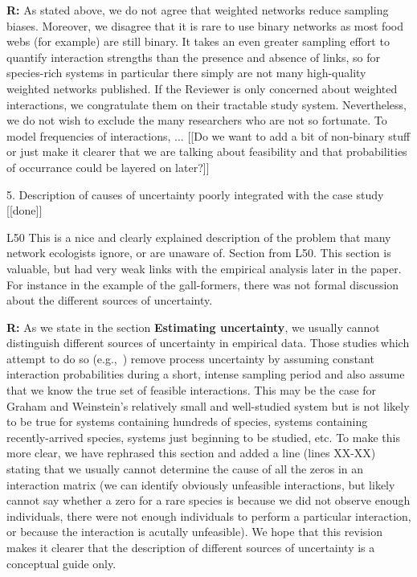 \documentclass[12pt]{letter}
\newenvironment{refquote}{\bigskip \begin{it}}{\end{it}\smallskip}
\begin{document}
		\textbf{R:} As stated above, we do not agree that weighted networks reduce sampling biases. Moreover, we disagree that it is rare to use binary networks as most food webs (for example) are still binary. It takes an even greater sampling effort to quantify interaction strengths than the presence and absence of links, so for species-rich systems in particular there simply are not many high-quality weighted networks published. If the Reviewer is only concerned about weighted interactions, we congratulate them on their tractable study system. Nevertheless, we do not wish to exclude the many researchers who are not so fortunate.
		\smallskip
		To model frequencies of interactions, ...
			 [[Do we want to add a bit of non-binary stuff or just make it clearer that we are talking about feasibility and that probabilities of occurrance could be layered on later?]]


	5. Description of causes of uncertainty poorly integrated with the case study [[done]]

		\begin{refquote}
		L50 This is a nice and clearly explained description of the problem that many network ecologists ignore, or are unaware of.
		Section from L50. This section is valuable, but had very weak links with the empirical analysis later in the paper. For instance in the example of the gall-formers, there was not formal discussion about the different sources of uncertainty. 
		\end{refquote}

		\textbf{R:} As we state in the section \textbf{Estimating uncertainty}, we usually cannot distinguish different sources of uncertainty in empirical data. Those studies which attempt to do so (e.g.,~\citet{Graham2018}) remove process uncertainty by assuming constant interaction probabilities during a short, intense sampling period and also assume that we know the true set of feasible interactions. This may be the case for Graham and Weinstein's relatively small and well-studied system but is not likely to be true for systems containing hundreds of species, systems containing recently-arrived species, systems just beginning to be studied, etc.
		\smallskip
		To make this more clear, we have rephrased this section and added a line (lines XX-XX) stating that we usually cannot determine the cause of all the zeros in an interaction matrix (we can identify obviously unfeasible interactions, but likely cannot say whether a zero for a rare species is because we did not observe enough individuals, there were not enough individuals to perform a particular interaction, or because the interaction is acutally unfeasible). We hope that this revision makes it clearer that the description of different sources of uncertainty is a conceptual guide only.
\end{document}
